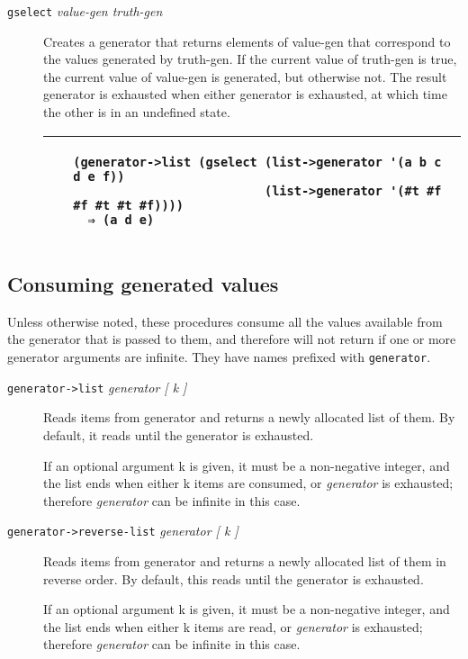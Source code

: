 \begin{description}
\item[\texttt{gselect} \emph{value-gen truth-gen}]
Creates a generator that returns elements of value-gen that correspond
to the values generated by truth-gen. If the current value of truth-gen
is true, the current value of value-gen is generated, but otherwise not.
The result generator is exhausted when either generator is exhausted, at
which time the other is in an undefined state.

\begin{longtable}[]{@{}ll@{}}
\toprule
\begin{minipage}[t]{0.47\columnwidth}\raggedright\strut
~\strut
\end{minipage} & \begin{minipage}[t]{0.47\columnwidth}\raggedright\strut
\begin{verbatim}
(generator->list (gselect (list->generator '(a b c d e f))
                          (list->generator '(#t #f #f #t #t #f))))
  ⇒ (a d e)
\end{verbatim}
\strut
\end{minipage}\tabularnewline
\bottomrule
\end{longtable}
\end{description}

\subsection{Consuming generated
values}\label{consuming-generated-values}

Unless otherwise noted, these procedures consume all the values
available from the generator that is passed to them, and therefore will
not return if one or more generator arguments are infinite. They have
names prefixed with \texttt{generator}.

\begin{description}
\item[\texttt{generator-\textgreater{}list} \emph{generator {[} k {]}}]
Reads items from generator and returns a newly allocated list of them.
By default, it reads until the generator is exhausted.

If an optional argument k is given, it must be a non-negative integer,
and the list ends when either k items are consumed, or \emph{generator}
is exhausted; therefore \emph{generator} can be infinite in this case.
\end{description}

\begin{description}
\item[\texttt{generator-\textgreater{}reverse-list} \emph{generator {[}
k {]}}]
Reads items from generator and returns a newly allocated list of them in
reverse order. By default, this reads until the generator is exhausted.

If an optional argument k is given, it must be a non-negative integer,
and the list ends when either k items are read, or \emph{generator} is
exhausted; therefore \emph{generator} can be infinite in this case.
\end{description}

